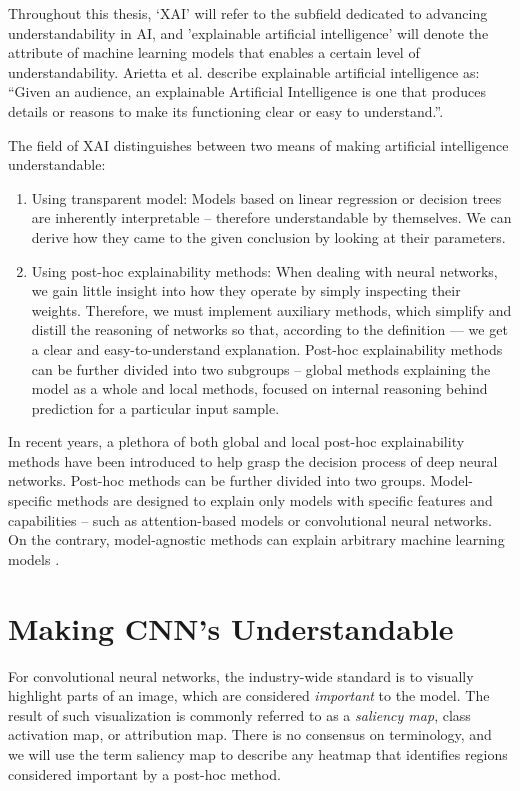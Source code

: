 Throughout this thesis, `XAI' will refer to the subfield dedicated to advancing understandability in AI, and 'explainable artificial intelligence' will denote the attribute of machine learning models that enables a certain level of understandability.
Arietta et al. \cite{arrieta-taxonomy} describe explainable artificial intelligence as: ``Given an audience, an explainable Artificial Intelligence is one that produces details or reasons to make its functioning clear or easy to understand.''.

The field of XAI distinguishes between two means of making artificial intelligence understandable:
\begin{enumerate}
    \item Using transparent model: Models based on linear regression or decision trees are inherently interpretable -- therefore understandable by themselves. We can derive how they came to the given conclusion by looking at their parameters.
    \item Using post-hoc explainability methods: When dealing with neural networks, we gain little insight into how they operate by simply inspecting their weights. Therefore, we must implement auxiliary methods, which simplify and distill the reasoning of networks so that, according to the definition --- we get a clear and easy-to-understand explanation. Post-hoc explainability methods can be further divided into two subgroups -- global methods explaining the model as a whole and local methods, focused on internal reasoning behind prediction for a particular input sample.
\end{enumerate}

In recent years, a plethora of both global and local post-hoc explainability methods have been introduced to help grasp the decision process of deep neural networks. Post-hoc methods can be further divided into two groups. Model-specific methods are designed to explain only models with specific features and capabilities -- such as attention-based models or convolutional neural networks. On the contrary, model-agnostic methods can explain arbitrary machine learning models \cite{arrieta-taxonomy}.

\section{Making CNN's Understandable}

For convolutional neural networks, the industry-wide standard is to visually highlight parts of an image, which are considered \emph{important} to the model. The result of such visualization is commonly referred to as a \emph{saliency map}, class activation map, or attribution map. There is no consensus on terminology, and we will use the term saliency map to describe any heatmap that identifies regions considered important by a post-hoc method. 


